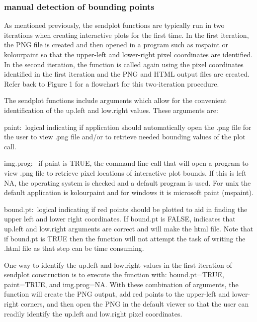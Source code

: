 \documentclass[]{article}
\begin{document}
\subsubsection{manual detection of bounding points}

\indent As mentioned previously, the sendplot functions are typically run in two iterations when creating interactive plots for the first time. In the first iteration, the PNG file is created and then opened in a program such as mspaint or kolourpaint so that the upper-left and lower-right pixel coordinates are identified. In the second iteration, the function is called again using the pixel coordinates identified in the first iteration and the PNG and HTML output files are created.  Refer back to Figure 1 for a flowchart for this two-iteration procedure. 


\indent The sendplot functions  include arguments which allow for the convenient identification of the up.left and low.right values. These arguments are:

\begin{description}
 \item{paint:~}{logical indicating if application should
    automatically open the .png file for the user to view .png file and/or
    to retrieve needed bounding values of the plot call.}

  \item{img.prog:~ }{if paint is TRUE, the command line call that will open
    a program to view .png file to retrieve pixel locations of interactive
    plot bounds. If this is left NA, the operating system is checked and
    a default program is used. For unix the default application is
    kolourpaint and for windows it is microsoft paint (mspaint).}

  \item{bound.pt:~}{logical indicating if red points should be plotted to
    aid in finding the upper left and lower right coordinates. If
    bound.pt is FALSE, indicates that up.left and low.right arguments
    are correct and will make the html file. Note that if bound.pt is TRUE then the function will not
    attempt the task of writing the .html file as that step can be time consuming.}

 \end{description}
One way to identify the up.left and low.right values in the first iteration of sendplot construction is to execute the function with: bound.pt=TRUE, paint=TRUE, and img.prog=NA. With these combination of arguments, the function will create the PNG output, add red points to the upper-left and lower-right corners, and then open the PNG in the default viewer so that the user can readily identify the up.left and low.right pixel coordinates. 
\end{document}
